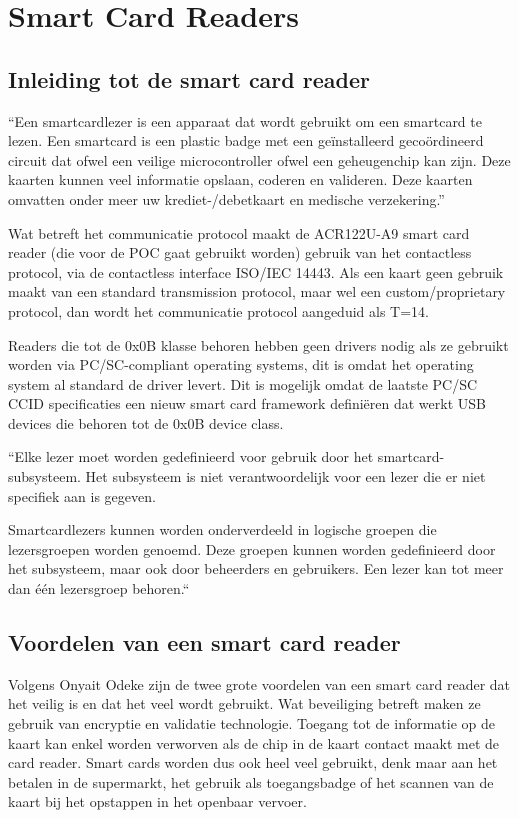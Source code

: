 \section{Smart Card Readers}
\subsection{Inleiding tot de smart card reader}
``Een smartcardlezer is een apparaat dat wordt gebruikt om een smartcard te lezen. Een smartcard is een plastic badge met een geïnstalleerd gecoördineerd circuit dat ofwel een veilige microcontroller ofwel een geheugenchip kan zijn. Deze kaarten kunnen veel informatie opslaan, coderen en valideren. Deze kaarten omvatten onder meer uw krediet-/debetkaart en medische verzekering.''

Wat betreft het communicatie protocol maakt de ACR122U-A9 smart card reader (die voor de POC gaat gebruikt worden) gebruik van het contactless protocol, via de contactless interface ISO/IEC 14443. Als een kaart geen gebruik maakt van een standard transmission protocol, maar wel een custom/proprietary protocol, dan wordt het communicatie protocol aangeduid als T=14.

Readers die tot de 0x0B klasse behoren hebben geen drivers nodig als ze gebruikt worden via PC/SC-compliant operating systems, dit is omdat het operating system al standard de driver levert. Dit is mogelijk omdat de laatste PC/SC CCID specificaties een nieuw smart card framework definiëren dat werkt USB devices die behoren tot de 0x0B device class.


``Elke lezer moet worden gedefinieerd voor gebruik door het smartcard-subsysteem. Het subsysteem is niet verantwoordelijk voor een lezer die er niet specifiek aan is gegeven.

Smartcardlezers kunnen worden onderverdeeld in logische groepen die lezersgroepen worden genoemd. Deze groepen kunnen worden gedefinieerd door het subsysteem, maar ook door beheerders en gebruikers. Een lezer kan tot meer dan één lezersgroep behoren.``

\subsection{Voordelen van een smart card reader}
Volgens Onyait Odeke zijn de twee grote voordelen van een smart card reader dat het veilig is en dat het veel wordt gebruikt. Wat beveiliging betreft maken ze gebruik van encryptie en validatie technologie. Toegang tot de informatie op de kaart kan enkel worden verworven als de chip in de kaart contact maakt met de card reader. Smart cards worden dus ook heel veel gebruikt, denk maar aan het betalen in de supermarkt, het gebruik als toegangsbadge of het scannen van de kaart bij het opstappen in het openbaar vervoer.

